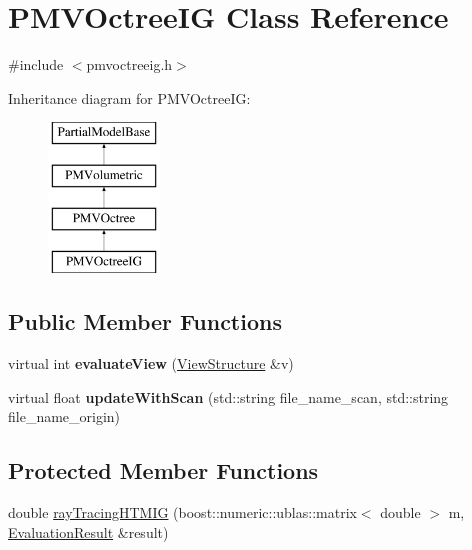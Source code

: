 \hypertarget{classPMVOctreeIG}{}\section{P\+M\+V\+Octree\+IG Class Reference}
\label{classPMVOctreeIG}


{\ttfamily \#include $<$pmvoctreeig.\+h$>$}

Inheritance diagram for P\+M\+V\+Octree\+IG\+:\begin{figure}[H]
\begin{center}
\leavevmode
\includegraphics[height=4.000000cm]{classPMVOctreeIG}
\end{center}
\end{figure}
\subsection*{Public Member Functions}
\begin{DoxyCompactItemize}
\item 
virtual int {\bfseries evaluate\+View} (\hyperlink{classViewStructure}{View\+Structure} \&v)\hypertarget{classPMVOctreeIG_a065d48a94b4343325d08bb55ffc0d332}{}\label{classPMVOctreeIG_a065d48a94b4343325d08bb55ffc0d332}

\item 
virtual float {\bfseries update\+With\+Scan} (std\+::string file\+\_\+name\+\_\+scan, std\+::string file\+\_\+name\+\_\+origin)\hypertarget{classPMVOctreeIG_ae5f60e009d2c0f71115e583dcdafdd96}{}\label{classPMVOctreeIG_ae5f60e009d2c0f71115e583dcdafdd96}

\end{DoxyCompactItemize}
\subsection*{Protected Member Functions}
\begin{DoxyCompactItemize}
\item 
double \hyperlink{classPMVOctreeIG_a752fb0c18f988c4d8a0653ce8b850a44}{ray\+Tracing\+H\+T\+M\+IG} (boost\+::numeric\+::ublas\+::matrix$<$ double $>$ m, \hyperlink{classEvaluationResult}{Evaluation\+Result} \&result)
\end{DoxyCompactItemize}
